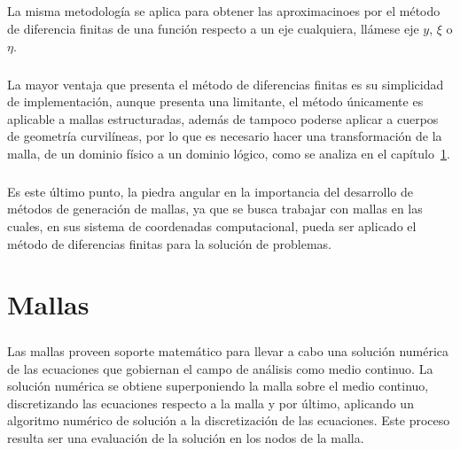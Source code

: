 \documentclass[letterpaper, openright, 12pt]{book}
\begin{document}
    \paragraph*{}
    La misma metodología se aplica para obtener las aproximacinoes por el método
    de diferencia finitas de una función respecto a un eje cualquiera, llámese
    eje $y$, $\xi$ o $\eta$.

    \paragraph*{}
    La mayor ventaja que presenta el método de diferencias finitas es su
    simplicidad de implementación, aunque presenta una limitante, el método
    únicamente es aplicable a mallas estructuradas, además de tampoco poderse
    aplicar a cuerpos de geometría curvilíneas, por lo que es necesario hacer
    una transformación de la malla, de un dominio físico a un dominio lógico,
    como se analiza en el capítulo~\ref{chap:mallas}.

    \paragraph*{}
    Es este último punto, la piedra angular en la importancia del desarrollo de
    métodos de generación de mallas, ya que se busca trabajar con mallas en las
    cuales, en sus sistema de coordenadas computacional, pueda ser aplicado el
    método de diferencias finitas para la solución de problemas.

    \chapter{Mallas}
    \label{chap:mallas}
    \paragraph*{}
    Las mallas proveen soporte matemático para llevar a cabo una solución
    numérica de las ecuaciones que gobiernan el campo de análisis como medio
    continuo. La solución numérica se obtiene superponiendo la malla sobre el
    medio continuo, discretizando las ecuaciones respecto a la malla y por
    último, aplicando un algoritmo numérico de solución a la discretización de
    las ecuaciones. Este proceso resulta ser una evaluación de la solución en
    los nodos de la malla.
\end{document}

